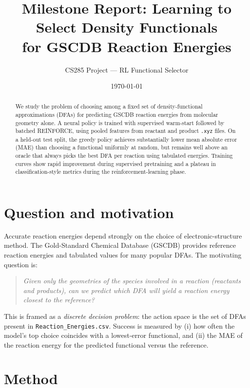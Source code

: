 \documentclass[11pt]{article}
\title{Milestone Report: Learning to Select Density Functionals\\for GSCDB Reaction Energies}
\author{CS285 Project --- RL Functional Selector}
\date{\today}
\begin{document}
\maketitle

\begin{abstract}
We study the problem of choosing among a fixed set of density-functional approximations (DFAs) for predicting GSCDB reaction energies from molecular geometry alone. A neural policy is trained with supervised warm-start followed by batched REINFORCE, using pooled features from reactant and product \texttt{.xyz} files. On a held-out test split, the greedy policy achieves substantially lower mean absolute error (MAE) than choosing a functional uniformly at random, but remains well above an oracle that always picks the best DFA per reaction using tabulated energies. Training curves show rapid improvement during supervised pretraining and a plateau in classification-style metrics during the reinforcement-learning phase.
\end{abstract}

\section{Question and motivation}

Accurate reaction energies depend strongly on the choice of electronic-structure method. The Gold-Standard Chemical Database (GSCDB) provides reference reaction energies and tabulated values for many popular DFAs. The motivating question is:

\begin{quote}
\textit{Given only the geometries of the species involved in a reaction (reactants and products), can we predict which DFA will yield a reaction energy closest to the reference?}
\end{quote}

This is framed as a \emph{discrete decision problem}: the action space is the set of DFAs present in \texttt{Reaction\_Energies.csv}. Success is measured by (i) how often the model's top choice coincides with a lowest-error functional, and (ii) the MAE of the reaction energy for the predicted functional versus the reference.

\section{Method}
\end{document}
